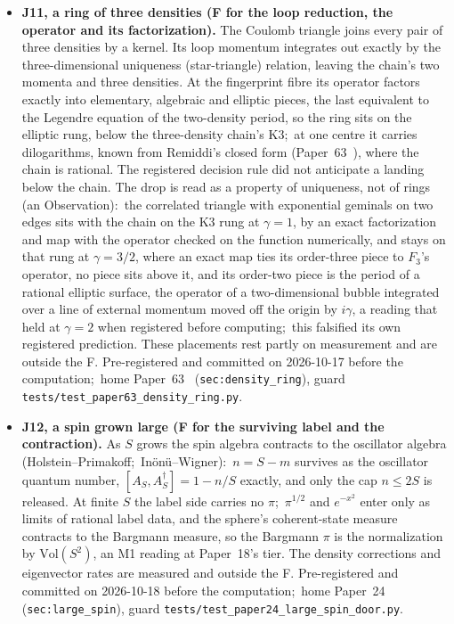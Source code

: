 \documentclass[11pt,a4paper]{article}
\theoremstyle{plain}
\theoremstyle{definition}
\begin{document}
\begin{itemize}
  \item \textbf{J11, a ring of three densities (F for the loop reduction, the operator and its factorization).} The Coulomb triangle joins every pair of three densities by a kernel. Its loop momentum integrates out exactly by the three-dimensional uniqueness (star-triangle) relation, leaving the chain's two momenta and three densities. At the fingerprint fibre its operator factors exactly into elementary, algebraic and elliptic pieces, the last equivalent to the Legendre equation of the two-density period, so the ring sits on the elliptic rung, below the three-density chain's K3;\ at one centre it carries dilogarithms, known from Remiddi's closed form (Paper~63~\cite{paper63}), where the chain is rational. The registered decision rule did not anticipate a landing below the chain. The drop is read as a property of uniqueness, not of rings (an Observation):\ the correlated triangle with exponential geminals on two edges sits with the chain on the K3 rung at $\gamma=1$, by an exact factorization and map with the operator checked on the function numerically, and stays on that rung at $\gamma=3/2$, where an exact map ties its order-three piece to $F_3$'s operator, no piece sits above it, and its order-two piece is the period of a rational elliptic surface, the operator of a two-dimensional bubble integrated over a line of external momentum moved off the origin by $i\gamma$, a reading that held at $\gamma=2$ when registered before computing;\ this falsified its own registered prediction. These placements rest partly on measurement and are outside the F. Pre-registered and committed on 2026-10-17 before the computation;\ home Paper~63~\cite{paper63} (\texttt{sec:density\_ring}), guard \texttt{tests/test\_paper63\_density\_ring.py}.
  \item \textbf{J12, a spin grown large (F for the surviving label and the contraction).} As $S$ grows the spin algebra contracts to the oscillator algebra (Holstein--Primakoff;\ In\"on\"u--Wigner):\ $n = S - m$ survives as the oscillator quantum number, $[A_S, A_S^\dagger] = 1 - n/S$ exactly, and only the cap $n \le 2S$ is released. At finite $S$ the label side carries no $\pi$;\ $\pi^{1/2}$ and $e^{-x^2}$ enter only as limits of rational label data, and the sphere's coherent-state measure contracts to the Bargmann measure, so the Bargmann $\pi$ is the normalization by $\mathrm{Vol}(S^2)$, an M1 reading at Paper~18's tier. The density corrections and eigenvector rates are measured and outside the F. Pre-registered and committed on 2026-10-18 before the computation;\ home Paper~24 (\texttt{sec:large\_spin}), guard \texttt{tests/test\_paper24\_large\_spin\_door.py}.

\end{itemize}
\end{document}
